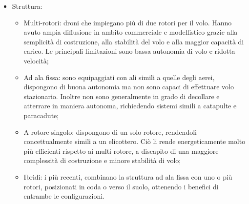 \begin{itemize}
\begin{itemize}
		\end{itemize}
	\item Struttura:
		\begin{itemize}
			\item Multi-rotori: droni che impiegano più di due rotori per il volo. Hanno avuto ampia diffusione in ambito commerciale e modellistico grazie alla semplicità di costruzione, alla stabilità del volo e alla maggior capacità di carico. Le principali limitazioni sono bassa autonomia di volo e ridotta velocità;
			\item Ad ala fissa: sono equipaggiati con ali simili a quelle degli aerei, dispongono di buona autonomia ma non sono capaci di effettuare volo stazionario. Inoltre non sono generalmente in grado di decollare e atterrare in maniera autonoma, richiedendo sistemi simili a catapulte e paracadute;
			\item A rotore singolo: dispongono di un solo rotore, rendendoli concettualmente simili a un elicottero. Ciò li rende energeticamente molto più efficienti rispetto ai multi-rotore, a discapito di una maggiore complessità di costruzione e minore stabilità di volo;
			\item Ibridi: i più recenti, combinano la struttura ad ala fissa con uno o più rotori, posizionati in coda o verso il suolo, ottenendo i benefici di entrambe le configurazioni. 
		\end{itemize}
\end{itemize}

